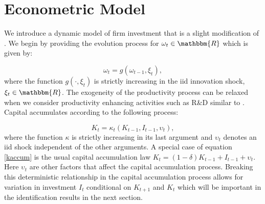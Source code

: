 \documentclass{article}
\begin{document}
\section{Econometric Model}

We introduce a dynamic model of firm investment that is a slight modification of \cite{Ericson1995}. We begin by providing the evolution process for $\omega_{t}\in \mathbbm{R}$ which is given by:

\begin{equation} \label{ar1}
\omega_{t}=g(\omega_{t-1}, \xi_{t}),
\end{equation}
where the function $g(\cdot, \xi_{t})$ is strictly increasing in the iid innovation shock, $\xi_{t}\in \mathbbm{R}$. The exogeneity of the productivity process can be relaxed when we consider productivity enhancing activities such as R\&D similar to \cite{Doraszelski2013}.\\

Capital accumulates according to the following process:

\begin{equation} \label{kaccum}
K_{t}=\kappa_{t}(K_{t-1}, I_{t-1}, \upsilon_{t}),
\end{equation}
where the function $\kappa$ is strictly increasing in its last argument and $\upsilon_{t}$ denotes an iid shock independent of the other arguments. A special case of equation \eqref{kaccum} is the usual capital accumulation law $K_{t}=(1-\delta)K_{t-1}+I_{t-1}+\upsilon_{t}$. Here $\upsilon_{t}$ are other factors that affect the capital accumulation process. Breaking this deterministic relationship in the capital accumulation process allows for variation in investment $I_{t}$ conditional on $K_{t+1}$ and $K_{t}$ which will be important in the identification results in the next section. 
\end{document}
